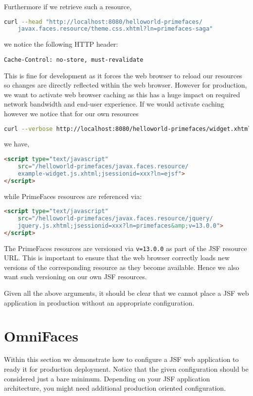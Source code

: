 Furthermore if we retrieve such a resource,
\begin{lstlisting}[language=bash]
curl --head "http://localhost:8080/helloworld-primefaces/
	javax.faces.resource/theme.css.xhtml?ln=primefaces-saga"
\end{lstlisting}
we notice the following HTTP header:
\begin{lstlisting}
Cache-Control: no-store, must-revalidate
\end{lstlisting}
This is fine for development as it forces the web browser to reload our resources so changes are directly reflected within the web browser.
However for production, we want to activate web browser caching as this has a huge impact on required network bandwidth and end-user experience.
If we would activate caching however we notice that for our own resources
\begin{lstlisting}[language=bash]
curl --verbose http://localhost:8080/helloworld-primefaces/widget.xhtml
\end{lstlisting}
we have,
\begin{lstlisting}[language=html]
<script type="text/javascript"
	src="/helloworld-primefaces/javax.faces.resource/
	example-widget.js.xhtml;jsessionid=xxx?ln=ejsf">
</script>
\end{lstlisting}
while PrimeFaces resources are referenced via:
\begin{lstlisting}[language=html]
<script type="text/javascript"
	src="/helloworld-primefaces/javax.faces.resource/jquery/
	jquery.js.xhtml;jsessionid=xxx?ln=primefaces&amp;v=13.0.0">
</script>
\end{lstlisting}
The PrimeFaces resources are versioned via \texttt{v=13.0.0} as part of the JSF resource URL.
This is important to ensure that the web browser correctly loads new versions of the corresponding resource as they become available.
Hence we also want such versioning on our own JSF resources.

Given all the above arguments, it should be clear that we cannot place a JSF web application in production without an appropriate configuration.

\section{OmniFaces}
Within this section we demonstrate how to configure a JSF web application to ready it for production deployment.
Notice that the given configuration should be considered just a bare minimum.
Depending on your JSF application architecture, you might need additional production oriented configuration.

